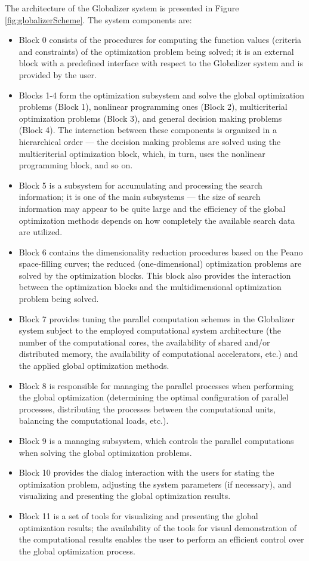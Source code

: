 \documentclass{naco}
\theoremstyle{definition}
\begin{document}
\par
The architecture of the Globalizer system is presented in Figure \ref{fig:globalizerScheme}.
The system components are:
\begin{itemize}
  \item Block 0 consists of the procedures for computing the function values
  (criteria and constraints) of the optimization problem being solved; it is an external
  block with a predefined interface with respect to the Globalizer system and is provided by the user.
  \item Blocks 1-4 form the optimization subsystem and solve the global optimization
  problems (Block 1), nonlinear programming ones (Block 2), multicriterial optimization problems
  (Block 3), and general decision making problems (Block 4). The interaction between these
  components is organized in a hierarchical order --- the decision making problems are
  solved using the multicriterial optimization block, which, in turn, uses the nonlinear programming block, and so on.
  \item Block 5 is a subsystem for accumulating and processing the search information; it is one of the main subsystems --- the size of search information may appear to be quite large and the efficiency of the global optimization methods depends on how completely the available search data are utilized.
  \item Block 6 contains the dimensionality reduction procedures based on the Peano space-filling curves; the reduced (one-dimensional) optimization problems are solved by the optimization blocks. This block also provides the interaction between the optimization blocks and the multidimensional optimization problem being solved.
  \item Block 7 provides tuning the parallel computation schemes in the Globalizer system subject to the employed computational system architecture (the number of the computational cores, the availability of shared and/or distributed memory, the availability of computational accelerators, etc.) and the applied global optimization methods.
  \item Block 8 is responsible for managing the parallel processes when performing the global optimization (determining the optimal configuration of parallel processes, distributing the processes between the computational units, balancing the computational loads, etc.).
  \item Block 9 is a managing subsystem, which controls the parallel computations when solving the global optimization problems.
  \item Block 10 provides the dialog interaction with the users for stating the optimization problem, adjusting the system parameters (if necessary), and visualizing and presenting the global optimization results.
  \item Block 11 is a set of tools for visualizing and presenting the global optimization results; the availability of the tools for visual demonstration of the computational results enables the user to perform an efficient control over the global optimization process.
\end{itemize}
\end{document}
